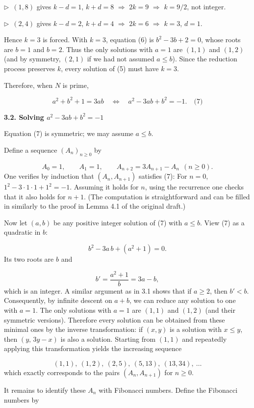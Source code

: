 \documentclass{llmxive}
\providecommand{\solutionheading}[1]{\par\smallskip\noindent\textbf{#1}\par}
\providecommand{\compactbullet}[1]{\par\noindent$\triangleright$~#1\par}
\begin{document}
\compactbullet{\((1,8)\) gives \(k-d=1\), \(k+d=8\) \(\Rightarrow\) \(2k=9\) \(\Rightarrow\) \(k=9/2\), not integer.}
\compactbullet{\((2,4)\) gives \(k-d=2\), \(k+d=4\) \(\Rightarrow\) \(2k=6\) \(\Rightarrow\) \(k=3\), \(d=1\).}
Hence \(k=3\) is forced. With \(k=3\), equation (6) is \(b^{2}-3b+2=0\), whose roots are \(b=1\) and \(b=2\). Thus the only solutions with \(a=1\) are \((1,1)\) and \((1,2)\) (and by symmetry, \((2,1)\) if we had not assumed \(a\le b\)). Since the reduction process preserves \(k\), every solution of (5) must have \(k=3\).\par
Therefore, when \(N\) is prime,\par
\[
a^{2}+b^{2}+1 = 3ab \quad\Longleftrightarrow\quad a^{2} - 3ab + b^{2} = -1. \quad\text{(7)}
\]
\solutionheading{3.2. Solving \(a^{2} - 3ab + b^{2} = -1\)}
Equation (7) is symmetric; we may assume \(a \le b\).\par
Define a sequence \((A_n)_{n\ge 0}\) by\par
\[
A_0 = 1,\qquad A_1 = 1,\qquad A_{n+2} = 3A_{n+1} - A_n\ \ (n\ge 0).
\]
One verifies by induction that \((A_n, A_{n+1})\) satisfies (7): For \(n=0\), \(1^2-3\cdot1\cdot1+1^2=-1\). Assuming it holds for \(n\), using the recurrence one checks that it also holds for \(n+1\). (The computation is straightforward and can be filled in similarly to the proof in Lemma 4.1 of the original draft.)\par
Now let \((a,b)\) be any positive integer solution of (7) with \(a \le b\). View (7) as a quadratic in \(b\):\par
\[
b^{2} - 3a\, b + (a^{2}+1) = 0.
\]
Its two roots are \(b\) and\par
\[
b' = \frac{a^{2}+1}{b} = 3a - b,
\]
which is an integer. A similar argument as in 3.1 shows that if \(a \ge 2\), then \(b' < b\). Consequently, by infinite descent on \(a+b\), we can reduce any solution to one with \(a=1\). The only solutions with \(a=1\) are \((1,1)\) and \((1,2)\) (and their symmetric versions). Therefore every solution can be obtained from these minimal ones by the inverse transformation: if \((x,y)\) is a solution with \(x \le y\), then \((y,\, 3y - x)\) is also a solution. Starting from \((1,1)\) and repeatedly applying this transformation yields the increasing sequence\par
\[
(1,1),\ (1,2),\ (2,5),\ (5,13),\ (13,34),\ \dots
\]
which exactly corresponds to the pairs \((A_n, A_{n+1})\) for \(n\ge 0\).\par
It remains to identify these \(A_n\) with Fibonacci numbers. Define the Fibonacci numbers by\par
\end{document}
